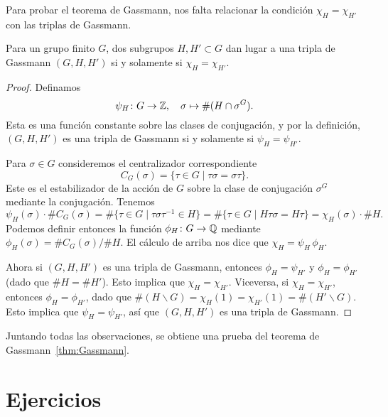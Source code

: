 Para probar el teorema de Gassmann, nos falta relacionar la condición
$\chi_H = \chi_{H'}$ con las triplas de Gassmann.

\begin{lema}
  Para un grupo finito $G$, dos subgrupos $H, H' \subset G$ dan lugar a una
  tripla de Gassmann $(G,H,H')$ si y solamente si $\chi_H = \chi_{H'}$.

  \begin{proof}
    Definamos
    $$\psi_H\colon G\to \mathbb{Z}, \quad \sigma \mapsto \# (H \cap \sigma^G).$$
    Esta es una función constante sobre las clases de conjugación, y por la
    definición, $(G,H,H')$ es una tripla de Gassmann si y solamente si
    $\psi_H = \psi_{H'}$.

    Para $\sigma \in G$ consideremos el centralizador correspondiente
    $$C_G (\sigma) = \{ \tau \in G \mid \tau\sigma = \sigma\tau \}.$$
    Este es el estabilizador de la acción de $G$ sobre la clase de conjugación
    $\sigma^G$ mediante la conjugación. Tenemos
    \[ \psi_H (\sigma)\cdot \# C_G (\sigma) =
      \# \{ \tau \in G \mid \tau \sigma \tau^{-1} \in H \} =
      \# \{ \tau \in G \mid H \tau \sigma = H \tau \} =
      \chi_H (\sigma) \cdot \# H. \]
    Podemos definir entonces la función $\phi_H\colon G \to \mathbb{Q}$ mediante
    $\phi_H (\sigma) = \# C_G (\sigma) / \# H$. El cálculo de arriba nos dice
    que $\chi_H = \psi_H\,\phi_H$.

    Ahora si $(G,H,H')$ es una tripla de Gassmann, entonces $\phi_H = \psi_{H'}$
    y $\phi_H = \phi_{H'}$ (dado que $\# H = \# H'$). Esto implica que
    $\chi_H = \chi_{H'}$. Viceversa, si $\chi_H = \chi_{H'}$, entonces
    $\phi_H = \phi_{H'}$, dado que
    $\# (H\backslash G) = \chi_H (1) = \chi_{H'} (1) = \# (H'\backslash G)$.
    Esto implica que $\psi_H = \psi_{H'}$, así que $(G,H,H')$ es una tripla de
    Gassmann.
  \end{proof}
\end{lema}

Juntando todas las observaciones, se obtiene una prueba del teorema de
Gassmann~\ref{thm:Gassmann}.


\pagebreak


\section*{Ejercicios}


